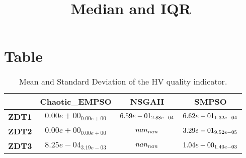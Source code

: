 \documentclass{article}
\title{Median and IQR}
\author{}
\begin{document}
\maketitle
\section{Table}
\begin{table}[!htp]
  \caption{Mean and Standard Deviation of the HV quality indicator.}
  \label{table:HV}
  \centering
  \begin{scriptsize}
  \begin{tabular}{c|ccc}
      & \textbf{Chaotic\_EMPSO} & \textbf{NSGAII} & \textbf{SMPSO} \\\hline
      \textbf{ZDT1} & $0.00e+00_{0.00e+00} $ & $ \cellcolor{gray25} 6.59e-01_{2.88e-04} $ & $ \cellcolor{gray95} 6.62e-01_{1.32e-04}$ \\
      \textbf{ZDT2} & $0.00e+00_{0.00e+00} $ & $ \cellcolor{gray25} nan_{nan} $ & $ \cellcolor{gray95} 3.29e-01_{9.52e-05}$ \\
      \textbf{ZDT3} & $8.25e-04_{3.19e-03} $ & $ \cellcolor{gray25} nan_{nan} $ & $ \cellcolor{gray95} 1.04e+00_{1.40e-03}$ \\
  \end{tabular}
  \end{scriptsize}
\end{table}
\end{document}
